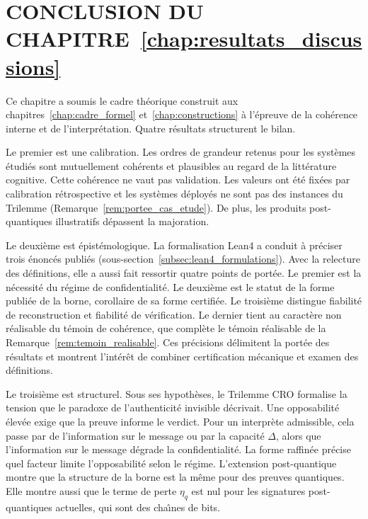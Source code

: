 
\section{CONCLUSION DU CHAPITRE~\ref{chap:resultats_discussions}}
\label{sec:conclusion_resultats_discussions}

\begin{sloppypar}
Ce chapitre a soumis le cadre th\'eorique
construit aux chapitres~\ref{chap:cadre_formel} et~\ref{chap:constructions} \`a l'\'epreuve de la coh\'erence
interne et de l'interpr\'etation. Quatre r\'esultats structurent le bilan.

Le premier est une calibration. Les ordres de grandeur retenus pour
les syst\`emes \'etudi\'es sont mutuellement coh\'erents et plausibles au regard
de la litt\'erature cognitive. Cette coh\'erence ne vaut pas validation. Les
valeurs ont \'et\'e fix\'ees par calibration r\'etrospective et les syst\`emes
d\'eploy\'es ne sont pas des instances du Trilemme
(Remarque~\ref{rem:portee_cas_etude}). De plus, les produits post-quantiques
illustratifs d\'epassent la majoration.

Le deuxi\`eme est \'epist\'emologique. La formalisation Lean4 a conduit \`a pr\'eciser
trois \'enonc\'es publi\'es (sous-section~\ref{subsec:lean4_formulations}). Avec la relecture
des d\'efinitions, elle a aussi fait ressortir quatre points de port\'ee. Le premier est la n\'ecessit\'e du r\'egime de
confidentialit\'e. Le deuxi\`eme est le statut de la forme publi\'ee de la borne, corollaire de sa
forme certifi\'ee. Le troisi\`eme distingue fiabilit\'e de reconstruction et
fiabilit\'e de v\'erification. Le dernier tient au caract\`ere non r\'ealisable du t\'emoin de
coh\'erence, que compl\`ete le t\'emoin r\'ealisable de la Remarque~\ref{rem:temoin_realisable}. Ces pr\'ecisions d\'elimitent la port\'ee des r\'esultats et montrent
l'int\'er\^et de combiner certification m\'ecanique et examen des d\'efinitions.

Le troisi\`eme est structurel. Sous ses hypoth\`eses, le Trilemme CRO
formalise la tension que le paradoxe de l'authenticit\'e invisible
d\'ecrivait. Une opposabilit\'e \'elev\'ee exige que la preuve informe le verdict.
Pour un interpr\`ete admissible, cela passe par de l'information sur le
message ou par la capacit\'e $\Delta$, alors que l'information sur le message d\'egrade la
confidentialit\'e. La forme raffin\'ee pr\'ecise quel facteur limite
l'opposabilit\'e selon le r\'egime. L'extension post-quantique montre que la
structure de la borne est la m\^eme pour des preuves quantiques. Elle montre aussi que le
terme de perte $\eta_q$ est nul pour les signatures post-quantiques
actuelles, qui sont des cha\^{\i}nes de bits.


\end{sloppypar}
